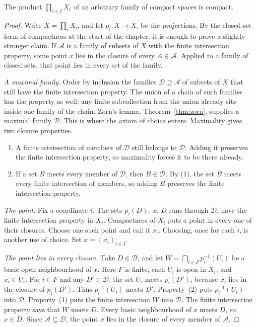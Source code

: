 \begin{theorem}[Tychonoff, 1935]\label{thm:tychonoff}
The product $\prod_{i\in I}X_i$ of an arbitrary family of compact spaces is compact.
\end{theorem}
\begin{proof}
Write $X=\prod_i X_i$, and let $p_i:X\to X_i$ be the projections. By the closed-set form of compactness at the start of the chapter, it is enough to prove a slightly stronger claim. If $\mathcal A$ is a family of subsets of $X$ with the finite intersection property, some point $x$ lies in the closure of every $A\in\mathcal A$. Applied to a family of closed sets, that point lies in every set of the family.

\emph{A maximal family.} Order by inclusion the families $\mathcal D\supseteq\mathcal A$ of subsets of $X$ that still have the finite intersection property. The union of a chain of such families has the property as well: any finite subcollection from the union already sits inside one family of the chain. Zorn's lemma, Theorem~\ref{thm:zorn}, supplies a maximal family $\mathcal D$. This is where the axiom of choice enters. Maximality gives two closure properties.
\begin{enumerate}[label=(\arabic*)]
\item A finite intersection of members of $\mathcal D$ still belongs to $\mathcal D$. Adding it preserves the finite intersection property, so maximality forces it to be there already.
\item If a set $B$ meets every member of $\mathcal D$, then $B\in\mathcal D$. By (1), the set $B$ meets every finite intersection of members, so adding $B$ preserves the finite intersection property.
\end{enumerate}

\emph{The point.} Fix a coordinate $i$. The sets $p_i(D)$, as $D$ runs through $\mathcal D$, have the finite intersection property in $X_i$. Compactness of $X_i$ puts a point in every one of their closures. Choose one such point and call it $x_i$. Choosing, once for each $i$, is another use of choice. Set $x=(x_i)_{i\in I}$.

\emph{The point lies in every closure.} Take $D\in\mathcal D$, and let $W=\bigcap_{i\in F}p_i^{-1}(U_i)$ be a basic open neighbourhood of $x$. Here $F$ is finite, each $U_i$ is open in $X_i$, and $x_i\in U_i$. For $i\in F$ and any $D'\in\mathcal D$, the set $U_i$ meets $p_i(D')$, because $x_i$ lies in the closure of $p_i(D')$. Thus $p_i^{-1}(U_i)$ meets $D'$. Property~(2) puts $p_i^{-1}(U_i)$ into $\mathcal D$. Property~(1) puts the finite intersection $W$ into $\mathcal D$. The finite intersection property says that $W$ meets $D$. Every basic neighbourhood of $x$ meets $D$, so $x\in\bar D$. Since $\mathcal A\subseteq\mathcal D$, the point $x$ lies in the closure of every member of $\mathcal A$.
\end{proof}

